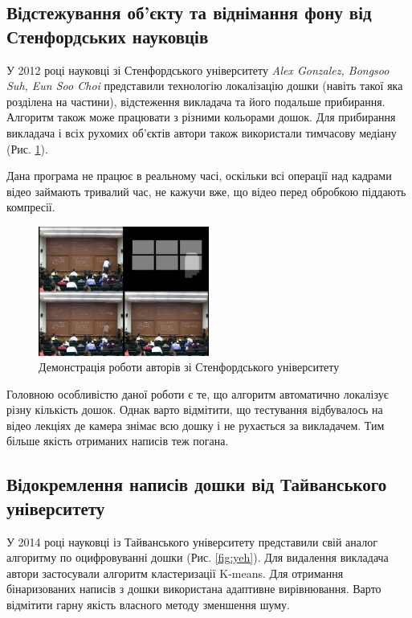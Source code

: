 \subsection{Відстежування об'єкту та віднімання фону від Стенфордських науковців}

У 2012 році науковці зі Стенфордського університету \textit{Alex Gonzalez,
  Bongsoo Suh, Eun Soo Choi} представили технологію \cite{suh} локалізацію дошки
(навіть такої яка розділена на частини), відстеження викладача та його
подальше прибирання. Алгоритм також може працювати з різними кольорами
дошок. Для прибирання викладача і всіх рухомих об'єктів автори також
використали тимчасову медіану (Рис. \ref{fig:suh}).

Дана програма не працює в реальному часі, оскільки всі операції над кадрами
відео займають тривалий час, не кажучи вже, що відео перед обробкою
піддають компресії.

\begin{figure}[H]
  \centering
  \includegraphics[width=0.5\textwidth]{images/suh}
  \caption{Демонстрація роботи авторів зі Стенфордського університету \cite{suh}
    \label{fig:suh}
  }
\end{figure}

Головною особливістю даної роботи є те, що  алгоритм автоматично локалізує
різну кількість дошок. Однак варто відмітити, що тестування відбувалось на
відео лекціях де камера знімає всю дошку і не рухається за викладачем. Тим більше
якість отриманих написів теж погана.

\subsection{Відокремлення написів дошки від Тайванського університету}

У 2014 році науковці із Тайванського університету представили свій аналог \cite{yeh}
алгоритму по оцифровуванні дошки (Рис. \ref{fig:yeh}). Для видалення викладача автори застосували
алгоритм кластеризації K-means. Для отримання бінаризованих написів з дошки
використана адаптивне вирівнювання. Варто відмітити гарну
якість власного методу зменшення шуму.

